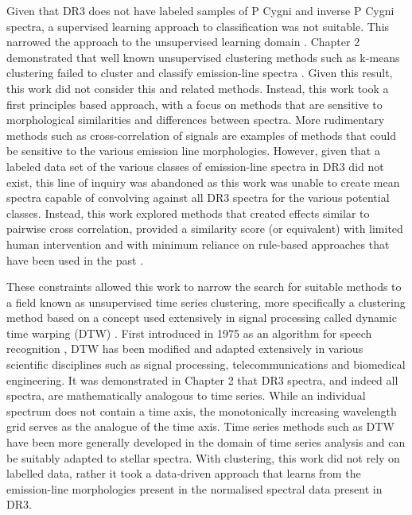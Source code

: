 Given that DR3 does not have labeled samples of P Cygni and inverse P Cygni spectra, a supervised learning approach to classification was not suitable. This narrowed the approach to the unsupervised learning domain \citep{hastie2009elements}. Chapter 2 demonstrated that well known unsupervised clustering methods such as k-means clustering failed to cluster and classify emission-line spectra \citep{garcia2018machine}. Given this result, this work did not consider this and related methods. Instead, this work took a first principles based approach, with a focus on methods that are sensitive to morphological similarities and differences between spectra. More rudimentary methods such as cross-correlation of signals are examples of methods that could be sensitive to the various emission line morphologies. However, given that a labeled data set of the various classes of emission-line spectra in DR3 did not exist, this line of inquiry was abandoned as this work was unable to create mean spectra capable of convolving against all DR3 spectra for the various potential classes. Instead, this work explored methods that created effects similar to pairwise cross correlation, provided a similarity score (or equivalent) with limited human intervention and with minimum reliance on rule-based approaches that have been used in the past \citep{traven2015gaia}. 

These constraints allowed this work to narrow the search for suitable methods to a field known as unsupervised time series clustering, more specifically a clustering method based on a concept used extensively in signal processing called dynamic time warping (DTW) \citep{kruskal1983overview}. First introduced in 1975 as an algorithm for speech recognition \citep{itakura1975minimum}, DTW has been modified and adapted extensively in various scientific disciplines such as signal processing, telecommunications and biomedical engineering. It was demonstrated in Chapter 2 that DR3 spectra, and indeed all spectra, are mathematically analogous to time series. While an individual spectrum does not contain a time axis, the monotonically increasing wavelength grid serves as the analogue of the time axis. Time series methods such as DTW have been more generally developed in the domain of time series analysis \citep{nielsen2019practical} and can be suitably adapted to stellar spectra. With clustering, this work did not rely on labelled data, rather it took a data-driven approach that learns from the emission-line morphologies present in the normalised spectral data present in DR3.

